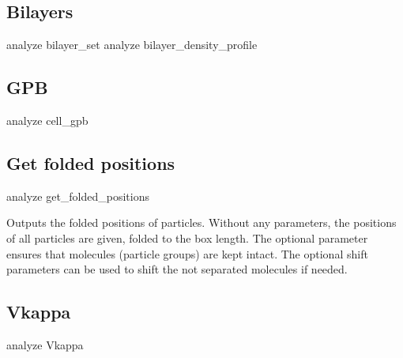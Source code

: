
\subsection{Bilayers}
\label{analyze:bilayers}

\begin{essyntax}
   analyze bilayer_set
   analyze bilayer_density_profile
\end{essyntax}


\subsection{GPB}
\label{analyze:cellgpb}

\begin{essyntax}
  analyze cell_gpb  
   
\end{essyntax}


\subsection{Get folded positions}
\label{analyze:folded}

\begin{essyntax}
  analyze get_folded_positions  
\end{essyntax}

Outputs the folded positions of particles. Without any parameters, the
positions of all particles are given, folded to the box length. The
optional parameter  ensures that molecules
(particle groups) are kept intact. The optional shift parameters can
be used to shift the not separated molecules if needed.

\subsection{Vkappa}
\label{analyze:Vkappa}

\begin{pysyntax}
\end{pysyntax}
\begin{essyntax}
  analyze Vkappa 
\end{essyntax}

